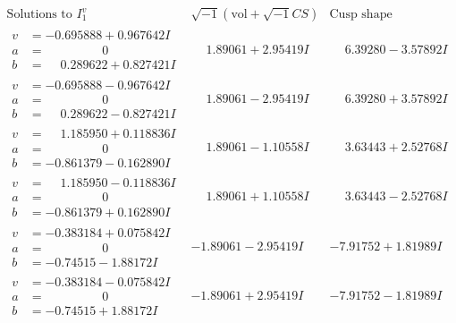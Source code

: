 \documentclass[1p]{elsarticle_modified}
\theoremstyle{definition}
\newcommand{\I}{\sqrt{-1}}
\begin{document}
$$\begin{array}{c|c|c}  
\text{Solutions to }I^v_{1}& \I (\text{vol} + \sqrt{-1}CS) & \text{Cusp shape}\\
 \hline 
\begin{aligned}
v &= -0.695888 + 0.967642 I \\
a &= \phantom{-0.000000 } 0 \\
b &= \phantom{-}0.289622 + 0.827421 I\end{aligned}
 & \phantom{-}1.89061 + 2.95419 I & \phantom{-}6.39280 - 3.57892 I \\ \hline\begin{aligned}
v &= -0.695888 - 0.967642 I \\
a &= \phantom{-0.000000 } 0 \\
b &= \phantom{-}0.289622 - 0.827421 I\end{aligned}
 & \phantom{-}1.89061 - 2.95419 I & \phantom{-}6.39280 + 3.57892 I \\ \hline\begin{aligned}
v &= \phantom{-}1.185950 + 0.118836 I \\
a &= \phantom{-0.000000 } 0 \\
b &= -0.861379 - 0.162890 I\end{aligned}
 & \phantom{-}1.89061 - 1.10558 I & \phantom{-}3.63443 + 2.52768 I \\ \hline\begin{aligned}
v &= \phantom{-}1.185950 - 0.118836 I \\
a &= \phantom{-0.000000 } 0 \\
b &= -0.861379 + 0.162890 I\end{aligned}
 & \phantom{-}1.89061 + 1.10558 I & \phantom{-}3.63443 - 2.52768 I \\ \hline\begin{aligned}
v &= -0.383184 + 0.075842 I \\
a &= \phantom{-0.000000 } 0 \\
b &= -0.74515 - 1.88172 I\end{aligned}
 & -1.89061 - 2.95419 I & -7.91752 + 1.81989 I \\ \hline\begin{aligned}
v &= -0.383184 - 0.075842 I \\
a &= \phantom{-0.000000 } 0 \\
b &= -0.74515 + 1.88172 I\end{aligned}
 & -1.89061 + 2.95419 I & -7.91752 - 1.81989 I \\ \hline\begin{aligned}

\end{aligned}
\end{array}$$
\end{document}

